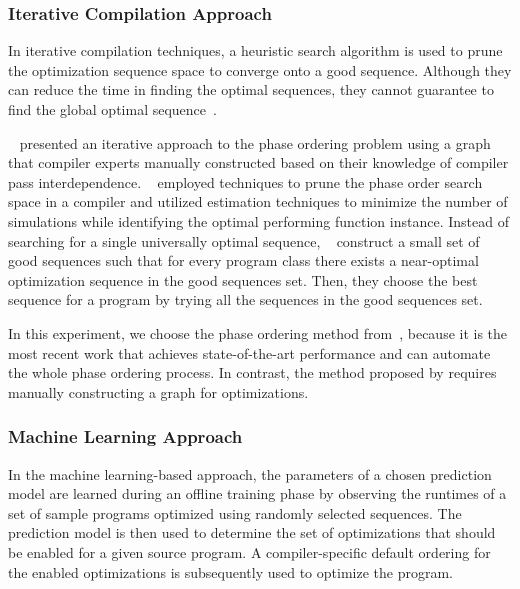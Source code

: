 \subsubsection{Iterative Compilation Approach}
In iterative compilation techniques, a heuristic search algorithm is used to prune the optimization sequence space to converge onto a good sequence. 
Although they can reduce the time in finding the optimal sequences, they cannot guarantee to find the global optimal sequence~\cite{nobre2016graph, kulkarni2009practical, purini2013finding, kulkarni2006exhaustive}. 

~\citet{nobre2016graph} presented an iterative approach to the phase ordering problem using a graph that compiler experts manually constructed based on their knowledge of compiler pass interdependence.
~\citet{kulkarni2009practical} employed techniques to prune the phase order search space in a compiler and utilized estimation techniques to minimize the number of simulations while identifying the optimal performing function instance. 
Instead of searching for a single universally optimal sequence, ~\citet{purini2013finding} construct a small set of good sequences such that for every program class there exists a near-optimal optimization sequence in the good sequences set. Then, they choose the best sequence for a program by trying all the sequences in the good sequences set.

In this experiment, we choose the phase ordering method from~\citet{purini2013finding}, because it is the most recent work that achieves state-of-the-art performance and can automate the whole phase ordering process. In contrast, the method proposed by \citet{nobre2016graph} requires manually constructing a  graph for optimizations.

\subsubsection{Machine Learning Approach}
In the machine learning-based approach, the parameters of a chosen prediction model are learned during an offline training phase by observing the runtimes of a set of sample programs optimized using randomly selected sequences. The prediction model is then used to determine the set of optimizations that should be enabled for a given source program. A compiler-specific default ordering for the enabled optimizations is subsequently used to optimize the program.


